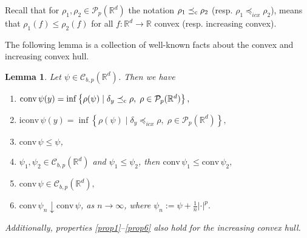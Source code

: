 \documentclass[reqno, a4paper]{amsart}
\newcommand{\lc}{\preceq_{\textnormal{c}}}
\newcommand{\lic}{\preceq_{icx}}
\newtheorem{lemma}[theorem]{Lemma}
\newcommand{\conv}{\mathrm{conv}\,}
\newcommand{\iconv}{\mathrm{iconv}\,}
\newcommand{\PP}{\mathcal{P}}
\newcommand{\cP}{\mathcal{P}}
\renewcommand{\P}{\cP}
\newcommand{\R}{\mathbb R}
\theoremstyle{definition}
\theoremstyle{definition}
\theoremstyle{definition}
\begin{document}

Recall that for $\rho_1,\rho_2\in\P_p(\R^d)$ the notation $\rho_1\lc \rho_2$ (resp. $\rho_1\lic \rho_2$), means that $\rho_1(f)\le\rho_2(f)$ for all $f:\R^d\to\R$ convex (resp. increasing convex).

The following lemma is a collection of well-known facts about the convex and increasing convex hull.


\begin{lemma} \label{repr lemm}
    Let $\psi \in {\mathcal{C}}_{b,p}(\R^d)$. Then we have 
    \begin{enumerate}[label=(\roman*)]\label{repr enac}
     \item \label{conv repr bullet}  $\conv{\psi}(y)=\inf\left\{\rho(\psi) \mid \delta_y\lc\rho,\; \rho\in\PP_p(\R^d)\right\},$
     \item \label{iconv repr bullet}  $\iconv{\psi}(y)=\inf\left\{\rho(\psi) \mid \delta_y\lic\rho,\; \rho\in\PP_p(\R^d)\right\},$
      \item \label{prop1} $\conv{\psi}\leq \psi$,
     \item \label{prop3}$\psi_1,\psi_2\in{\mathcal{C}}_{b,p}(\R^d)$ and $\psi_1\leq\psi_2$, then $\conv{\psi_1}\leq \conv{\psi_2},$
    \item \label{prop4}$\conv{\psi}\in{\mathcal{C}}_{b,p}(\R^d),$
    \item \label{prop6}$\conv{\psi_n}\downarrow \conv{\psi}$, as $n\to\infty$, where $\psi_n:=\psi+\frac{1}{n}|\cdot|^p.$
    \end{enumerate}
Additionally, properties \ref{prop1}--\ref{prop6} also hold for the increasing convex hull.
\end{lemma}
\end{document}
